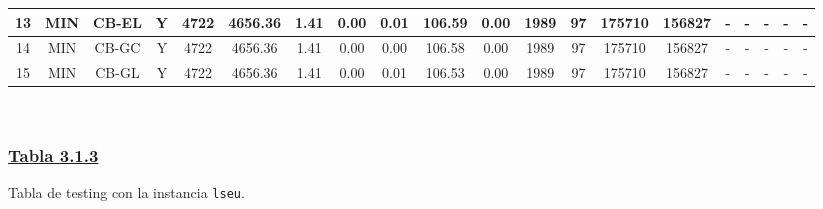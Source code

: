 {\begin{tabular}{ *{19}{c|} c }
\hline
13 & MIN & CB-EL & Y & 4722 & 4656.36 & 1.41 & 0.00 & 0.01 & 106.59 & 0.00 & 1989 & 97 & 175710 & 156827 & - & - & - & - & -\\
\hline
14 & MIN & CB-GC & Y & 4722 & 4656.36 & 1.41 & 0.00 & 0.00 & 106.58 & 0.00 & 1989 & 97 & 175710 & 156827 & - & - & - & - & -\\
\hline
15 & MIN & CB-GL & Y & 4722 & 4656.36 & 1.41 & 0.00 & 0.01 & 106.53 & 0.00 & 1989 & 97 & 175710 & 156827 & - & - & - & - & -\\
\hline
\end{tabular}\\
\vspace{4mm}
}

\subsubsection*{\underline{Tabla 3.1.3}}
\noindent Tabla de testing con la instancia \verb_lseu_.\\

